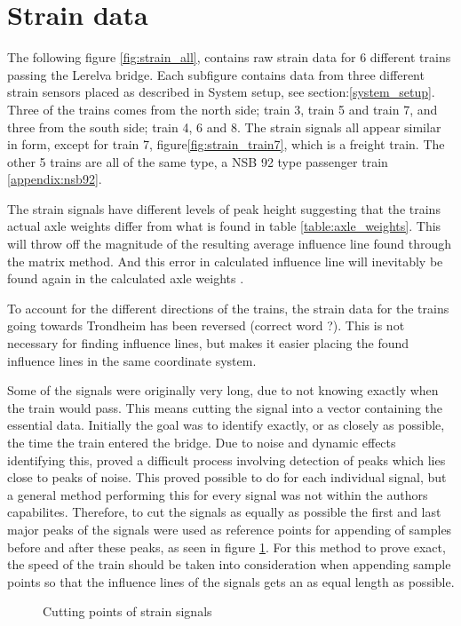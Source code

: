 \section{Strain data}
The following figure \ref{fig:strain_all}, contains raw strain data for 6 different trains passing the Lerelva bridge. Each subfigure contains data from three different strain sensors placed as described in System setup, see section:\ref{system_setup}. Three of the trains comes from the north side; train 3, train 5 and train 7, and three from the south side; train 4, 6 and 8. The strain signals all appear similar in form, except for train 7, figure\ref{fig:strain_train7}, which is a freight train. The other 5 trains are all of the same type, a NSB 92 type passenger train \ref{appendix:nsb92}.

The strain signals have different levels of peak height suggesting that the trains actual axle weights differ from what is found in table \ref{table:axle_weights}. This will throw off the magnitude of the resulting average influence line found through the matrix method. And this error in calculated influence line will inevitably be found again in the calculated axle weights \label{peaks_heights}.

To account for the different directions of the trains, the strain data for the trains going towards Trondheim has been reversed (correct word ?). This is not necessary for finding influence lines, but makes it easier placing the found influence lines in the same coordinate system.

Some of the signals were originally very long, due to not knowing exactly when the train would pass. This means cutting the signal into a vector containing the essential data. Initially the goal was to identify exactly, or as closely as possible, the time the train entered the bridge. Due to noise and dynamic effects identifying this, proved a difficult process involving detection of peaks which lies close to peaks of noise. This proved possible to do for each individual signal, but a general method performing this for every signal was not within the authors capabilites. Therefore, to cut the signals as equally as possible the first and last major peaks of the signals were used as reference points for appending of samples before and after these peaks, as seen in figure \ref{fig:cutting_points}. For this method to prove exact, the speed of the train should be taken into consideration when appending sample points so that the influence lines of the signals gets an as equal length as possible.
\begin{figure}[H]
	\begin{adjustbox}{center}
		
	\end{adjustbox}
	\caption{Cutting points of strain signals}
	\label{fig:cutting_points}
\end{figure}


